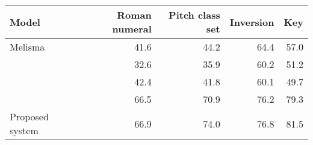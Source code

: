 \begin{tabular}{l|rrrr}
Model                        & Roman numeral & Pitch class set & Inversion & Key  \\
\hline
Melisma                      & 41.6          & 44.2            & 64.4      & 57.0 \\
\textcite{mcleod2021modular} & 32.6          & 35.9            & 60.2      & 51.2 \\
\textcite{chen2021attend}    & 42.4          & 41.8            & 60.1      & 49.7 \\
\textcite{micchi2021deep}    & 66.5          & 70.9            & 76.2      & 79.3 \\
Proposed system              & 66.9          & 74.0            & 76.8      & 81.5
\end{tabular}
